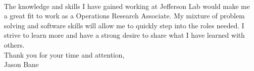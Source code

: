 \documentclass[12pt,letterpaper]{article}
\begin{document}
\paragraph{}The knowledge and skills I have gained working at Jefferson Lab would make me a great fit to work as a Operations Research Associate. My mixture of problem solving and software skills will allow me to quickly step into the roles needed. I strive to learn more and have a strong desire to share what I have learned with others. 
\\

\noindent Thank you for your time and attention,\\
\noindent Jason Bane
\end{document}
